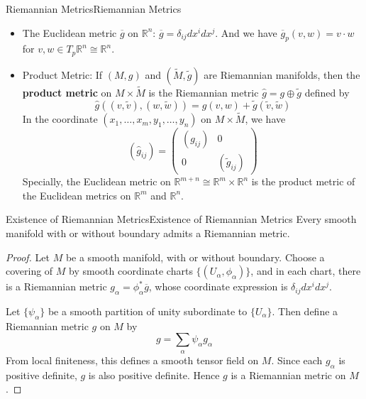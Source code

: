 \documentclass[../main.tex]{subfiles}
\begin{document}
\begin{example}{Riemannian Metrics}{Riemannian Metrics}
  \begin{itemize}
    \item The Euclidean metric $\overline{g}$ on $\mathbb{R}^n$: $\overline{g} = \delta_{ij}dx^i dx^j$. And we have $\overline{g}_p(v,w) = v\cdot w$ for $v,w\in T_p\mathbb{R}^n\cong \mathbb{R}^n$.
    \item Product Metric: If $(M, g)$ and $(\tilde{M}, \tilde{g})$ are Riemannian manifolds, then the \textbf{product metric} on $M\times \tilde{M}$ is the Riemannian metric $\hat{g} = g \oplus \tilde{g}$ defined by
      \begin{equation*}
        \hat{g}((v,\tilde{v}),(w,\tilde{w})) = g(v,w) + \tilde{g}(\tilde{v},\tilde{w})
      \end{equation*}
      In the coordinate $(x_1, \ldots , x_m, y_1, \ldots, y_n)$ on $M\times \tilde{M}$, we have
      \begin{equation*}
        (\hat{g}_{ij}) = \begin{pmatrix}
          (g_{ij}) & 0 \\
          0 & (\tilde{g}_{ij})
        \end{pmatrix}
      \end{equation*}
      Specially, the Euclidean metric on $\mathbb{R}^{m+n} \cong \mathbb{R}^m \times \mathbb{R}^n$ is the product metric of the Euclidean metrics on $\mathbb{R}^m$ and $\mathbb{R}^n$.
  \end{itemize}
\end{example}

\begin{theorem}{Existence of Riemannian Metrics}{Existence of Riemannian Metrics}
  Every smooth manifold with or without boundary admits a Riemannian metric.
\end{theorem}
\begin{proof}
  Let $M$ be a smooth manifold, with or without boundary. Choose a covering of $M$ by smooth coordinate charts $\{(U_\alpha, \phi_\alpha)\}$, and in each chart, there is a Riemannian metric $g_\alpha = \phi_\alpha^*\overline{g}$, whose coordinate expression is $\delta_{ij}dx^i dx^j$.

  Let $\{\psi_\alpha\}$ be a smooth partition of unity subordinate to $\{U_\alpha\}$. Then define a Riemannian metric $g$ on $M$ by
  \begin{equation}
    g = \sum_\alpha \psi_\alpha g_\alpha
  \end{equation}
  From local finiteness, this defines a smooth tensor field on $M$. Since each $g_\alpha$ is positive definite, $g$ is also positive definite. Hence $g$ is a Riemannian metric on $M$.
\end{proof}
\end{document}
